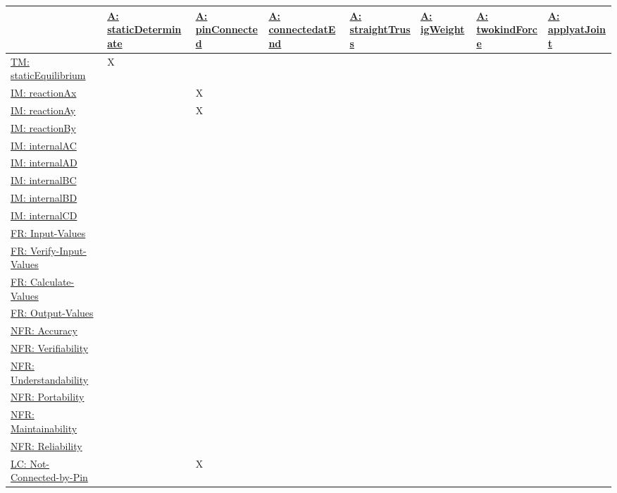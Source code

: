 \documentclass[12pt]{article}
\begin{document}
\begin{longtable}{l l l l l l l l}
\toprule
\textbf{} & \textbf{\hyperref[staticDeterminate]{A: staticDeterminate}} & \textbf{\hyperref[pinConnected]{A: pinConnected}} & \textbf{\hyperref[connectedatEnd]{A: connectedatEnd}} & \textbf{\hyperref[straightTruss]{A: straightTruss}} & \textbf{\hyperref[igWeight]{A: igWeight}} & \textbf{\hyperref[twokindForce]{A: twokindForce}} & \textbf{\hyperref[applyatJoint]{A: applyatJoint}}
\\
\midrule
\endhead
\hyperref[TM:staticEquilibrium]{TM: staticEquilibrium} & X &  &  &  &  &  & 
\\
\hyperref[IM:reactionAx]{IM: reactionAx} &  & X &  &  &  &  & 
\\
\hyperref[IM:reactionAy]{IM: reactionAy} &  & X &  &  &  &  & 
\\
\hyperref[IM:reactionBy]{IM: reactionBy} &  &  &  &  &  &  & 
\\
\hyperref[IM:internalAC]{IM: internalAC} &  &  &  &  &  &  & 
\\
\hyperref[IM:internalAD]{IM: internalAD} &  &  &  &  &  &  & 
\\
\hyperref[IM:internalBC]{IM: internalBC} &  &  &  &  &  &  & 
\\
\hyperref[IM:internalBD]{IM: internalBD} &  &  &  &  &  &  & 
\\
\hyperref[IM:internalCD]{IM: internalCD} &  &  &  &  &  &  & 
\\
\hyperref[inputValues]{FR: Input-Values} &  &  &  &  &  &  & 
\\
\hyperref[verifyInVals]{FR: Verify-Input-Values} &  &  &  &  &  &  & 
\\
\hyperref[calcValues]{FR: Calculate-Values} &  &  &  &  &  &  & 
\\
\hyperref[outputValues]{FR: Output-Values} &  &  &  &  &  &  & 
\\
\hyperref[accurate]{NFR: Accuracy} &  &  &  &  &  &  & 
\\
\hyperref[verifiable]{NFR: Verifiability} &  &  &  &  &  &  & 
\\
\hyperref[understandable]{NFR: Understandability} &  &  &  &  &  &  & 
\\
\hyperref[portable]{NFR: Portability} &  &  &  &  &  &  & 
\\
\hyperref[maintainable]{NFR: Maintainability} &  &  &  &  &  &  & 
\\
\hyperref[reliable]{NFR: Reliability} &  &  &  &  &  &  & 
\\
\hyperref[likeChgNCbP]{LC: Not-Connected-by-Pin} &  & X &  &  &  &  & 

\end{longtable}
\end{document}
